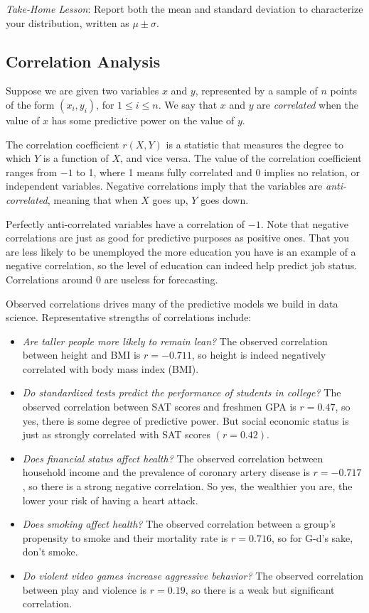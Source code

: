 \documentclass[10pt]{article}
\begin{document}
\textit{Take-Home Lesson}: Report both the mean and standard deviation to characterize your distribution, written as $\mu \pm \sigma$.

\subsection{Correlation Analysis}
Suppose we are given two variables $x$ and $y$, represented by a sample of $n$ points of the form $\left(x_{i}, y_{i}\right)$, for $1 \leq i \leq n$. We say that $x$ and $y$ are \textit{correlated} when the value of $x$ has some predictive power on the value of $y$.

The correlation coefficient $r(X, Y)$ is a statistic that measures the degree to which $Y$ is a function of $X$, and vice versa. The value of the correlation coefficient ranges from $-1$ to 1, where 1 means fully correlated and 0 implies no relation, or independent variables. Negative correlations imply that the variables are \textit{anti-correlated}, meaning that when $X$ goes up, $Y$ goes down.

Perfectly anti-correlated variables have a correlation of $-1$. Note that negative correlations are just as good for predictive purposes as positive ones. That you are less likely to be unemployed the more education you have is an example of a negative correlation, so the level of education can indeed help predict job status. Correlations around 0 are useless for forecasting.

Observed correlations drives many of the predictive models we build in data science. Representative strengths of correlations include:

\begin{itemize}
  \item \textit{Are taller people more likely to remain lean?} The observed correlation between height and BMI is $r=-0.711$, so height is indeed negatively correlated with body mass index (BMI).
  \item \textit{Do standardized tests predict the performance of students in college?} The observed correlation between SAT scores and freshmen GPA is $r=0.47$, so yes, there is some degree of predictive power. But social economic status is just as strongly correlated with SAT scores $(r=0.42)$.
  \item \textit{Does financial status affect health?} The observed correlation between household income and the prevalence of coronary artery disease is $r=-0.717$, so there is a strong negative correlation. So yes, the wealthier you are, the lower your risk of having a heart attack.
  \item \textit{Does smoking affect health?} The observed correlation between a group's propensity to smoke and their mortality rate is $r=0.716$, so for G-d's sake, don't smoke.
  \item \textit{Do violent video games increase aggressive behavior?} The observed correlation between play and violence is $r=0.19$, so there is a weak but significant correlation.
\end{itemize}
\end{document}
